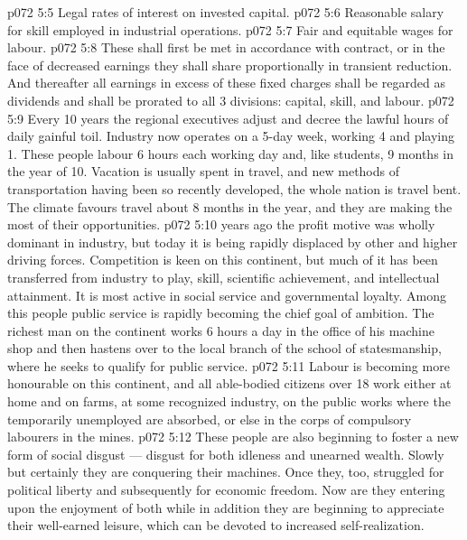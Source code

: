 \vs p072 5:5 \bibnobreakspace Legal rates of interest on invested capital.
\vs p072 5:6 \bibnobreakspace Reasonable salary for skill employed in industrial operations.
\vs p072 5:7 \bibnobreakspace Fair and equitable wages for labour.
\vs p072 5:8 \pc These shall first be met in accordance with contract, or in the face of decreased earnings they shall share proportionally in transient reduction. And thereafter all earnings in excess of these fixed charges shall be regarded as dividends and shall be prorated to all 3 divisions: capital, skill, and labour.
\vs p072 5:9 \pc Every 10 years the regional executives adjust and decree the lawful hours of daily gainful toil. Industry now operates on a 5\hyp{}day week, working 4 and playing 1. These people labour 6 hours each working day and, like students, 9 months in the year of 10. Vacation is usually spent in travel, and new methods of transportation having been so recently developed, the whole nation is travel bent. The climate favours travel about 8 months in the year, and they are making the most of their opportunities.
\vs p072 5:10  years ago the profit motive was wholly dominant in industry, but today it is being rapidly displaced by other and higher driving forces. Competition is keen on this continent, but much of it has been transferred from industry to play, skill, scientific achievement, and intellectual attainment. It is most active in social service and governmental loyalty. Among this people public service is rapidly becoming the chief goal of ambition. The richest man on the continent works 6 hours a day in the office of his machine shop and then hastens over to the local branch of the school of statesmanship, where he seeks to qualify for public service.
\vs p072 5:11 Labour is becoming more honourable on this continent, and all able\hyp{}bodied citizens over 18 work either at home and on farms, at some recognized industry, on the public works where the temporarily unemployed are absorbed, or else in the corps of compulsory labourers in the mines.
\vs p072 5:12 These people are also beginning to foster a new form of social disgust --- disgust for both idleness and unearned wealth. Slowly but certainly they are conquering their machines. Once they, too, struggled for political liberty and subsequently for economic freedom. Now are they entering upon the enjoyment of both while in addition they are beginning to appreciate their well\hyp{}earned leisure, which can be devoted to increased self\hyp{}realization.
